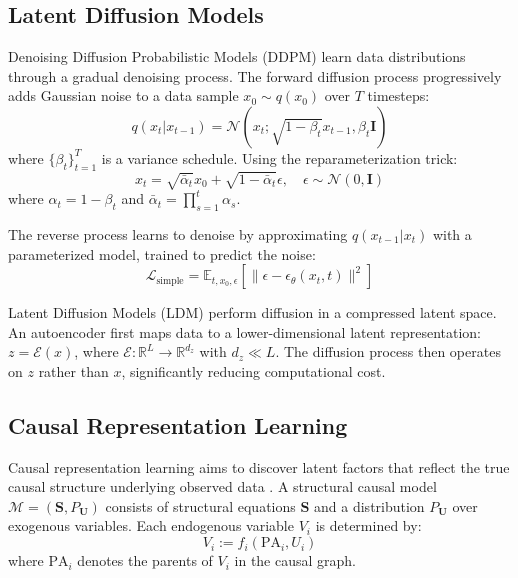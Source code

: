 \documentclass[lettersize,journal]{IEEEtran}
\begin{document}
\subsection{Latent Diffusion Models}

Denoising Diffusion Probabilistic Models (DDPM) \cite{ref14} learn data distributions through a gradual denoising process. The forward diffusion process progressively adds Gaussian noise to a data sample $x_0 \sim q(x_0)$ over $T$ timesteps:
\begin{equation}
q(x_t | x_{t-1}) = \mathcal{N}(x_t; \sqrt{1-\beta_t} x_{t-1}, \beta_t \mathbf{I})
\end{equation}
where $\{\beta_t\}_{t=1}^T$ is a variance schedule. Using the reparameterization trick:
\begin{equation}
x_t = \sqrt{\bar{\alpha}_t} x_0 + \sqrt{1-\bar{\alpha}_t} \epsilon, \quad \epsilon \sim \mathcal{N}(0, \mathbf{I})
\end{equation}
where $\alpha_t = 1 - \beta_t$ and $\bar{\alpha}_t = \prod_{s=1}^t \alpha_s$.

The reverse process learns to denoise by approximating $q(x_{t-1}|x_t)$ with a parameterized model, trained to predict the noise:
\begin{equation}
\mathcal{L}_{\text{simple}} = \mathbb{E}_{t, x_0, \epsilon} \left[ \| \epsilon - \epsilon_\theta(x_t, t) \|^2 \right]
\end{equation}

Latent Diffusion Models (LDM) \cite{ref15} perform diffusion in a compressed latent space. An autoencoder first maps data to a lower-dimensional latent representation: $z = \mathcal{E}(x)$, where $\mathcal{E}: \mathbb{R}^L \rightarrow \mathbb{R}^{d_z}$ with $d_z \ll L$. The diffusion process then operates on $z$ rather than $x$, significantly reducing computational cost.

\subsection{Causal Representation Learning}

Causal representation learning aims to discover latent factors that reflect the true causal structure underlying observed data \cite{ref16}. A structural causal model $\mathcal{M} = (\mathbf{S}, P_{\mathbf{U}})$ consists of structural equations $\mathbf{S}$ and a distribution $P_{\mathbf{U}}$ over exogenous variables. Each endogenous variable $V_i$ is determined by:
\begin{equation}
V_i := f_i(\text{PA}_i, U_i)
\end{equation}
where $\text{PA}_i$ denotes the parents of $V_i$ in the causal graph.
\end{document}
